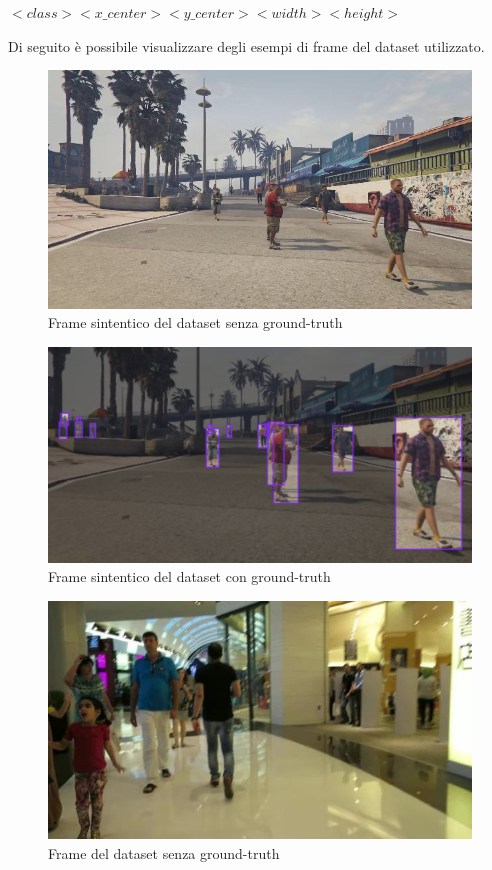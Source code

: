 \documentclass[12pt]{article}
\begin{document}
\begin{center}
    $<class><x\_center><y\_center><width><height>$
\end{center}
Di seguito è possibile visualizzare degli esempi di frame del dataset utilizzato.

\begin{figure}[H]
    \centering
    \includegraphics[width=1.00\textwidth]{./img/gta-original.jpg}
    \caption{Frame sintentico del dataset senza ground-truth}
    \label{fig:gta-frame}
\end{figure}

\begin{figure}[H]
    \centering
    \includegraphics[width=1.00\textwidth]{./img/gta-ground-truth.png}
    \caption{Frame sintentico del dataset con ground-truth}
    \label{fig:gta-frame-2}
\end{figure}

\begin{figure}[H]
    \centering
    \includegraphics[width=1.00\textwidth]{./img/dataset-original.jpg}
    \caption{Frame del dataset senza ground-truth}
    \label{fig:dataset-frame}
\end{figure}
\end{document}
